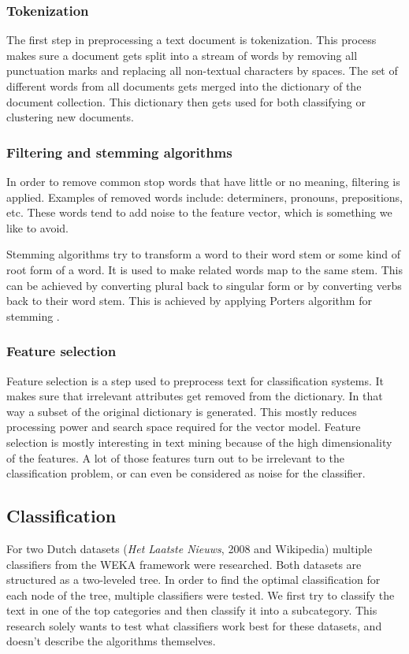 \documentclass[twocolumn,twoside,a4paper]{phdsymp} %
\begin{document}
\subsubsection{Tokenization}
The first step in preprocessing a text document is tokenization. This process makes sure a document gets split into a stream of words by removing all punctuation marks and replacing all non-textual characters by spaces. The set of different words from all documents gets merged into the dictionary of the document collection. This dictionary then gets used for both classifying or clustering new documents.

\subsubsection{Filtering and stemming algorithms}
In order to remove common stop words that have little or no meaning, filtering is applied. Examples of removed words include: determiners, pronouns, prepositions, etc. These words tend to add noise to the feature vector, which is something we like to avoid.

Stemming algorithms try to transform a word to their word stem or some kind of root form of a word. It is used to make related words map to the same stem. This can be achieved by converting plural back to singular form or by converting verbs back to their word stem. This is achieved by applying Porters algorithm for stemming \cite{Porter1980}.  

\subsubsection{Feature selection}
Feature selection is a step used to preprocess text for classification systems. It makes sure that irrelevant attributes get removed from the dictionary. In that way a subset of the original dictionary is generated. This mostly reduces processing power and search space required for the vector model. Feature selection is mostly interesting in text mining because of the high dimensionality of the features. A lot of those features turn out to be irrelevant to the classification problem, or can even be considered as noise for the classifier.

\subsection{Classification}
For two Dutch datasets (\textit{Het Laatste Nieuws}, 2008 and Wikipedia) multiple classifiers from the WEKA framework \cite{Hall2009} were researched. Both datasets are structured as a two-leveled tree. In order to find the optimal classification for each node of the tree, multiple classifiers were tested. We first try to classify the text in one of the top categories and then classify it into a subcategory. This research solely wants to test what classifiers work best for these datasets, and doesn't describe the algorithms themselves. 
\end{document}
